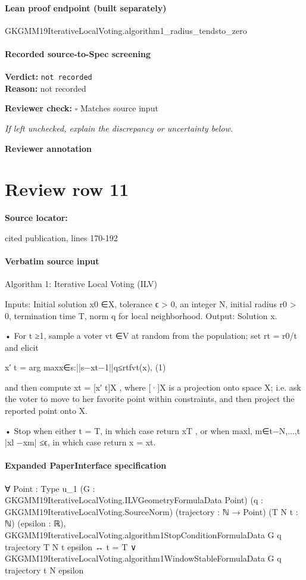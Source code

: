 \documentclass[10pt]{article}
\newcommand{\reviewerbox}{%
  \par\noindent\fbox{\parbox{0.96\linewidth}{\rule{0pt}{0.38in}}}\par
}
\newcommand{\reviewmatch}[1]{%
  \par\noindent\textbf{Reviewer check:} $\square$\; #1\par
  \noindent\emph{If left unchecked, explain the discrepancy or uncertainty below.}\par
}
\begin{document}
\paragraph{Lean proof endpoint (built separately)}\begin{ReviewVerbatim}
GKGMM19IterativeLocalVoting.algorithm1_radius_tendsto_zero
\end{ReviewVerbatim}

\paragraph{Recorded source-to-Spec screening}
\textbf{Verdict:} \texttt{not recorded}
\\
\textbf{Reason:} not recorded
\reviewmatch{Matches source input}
\noindent\textbf{Reviewer annotation}\par
\reviewerbox
\clearpage
\hypertarget{source-claim-f5582541b0eca601}{}
\section*{Review row 11}
\textbf{Source locator:} {\footnotesize\raggedright cited publication, lines 170-\allowbreak{}192\par}
\paragraph{Verbatim source input}
\begin{ReviewVerbatim}
Algorithm 1: Iterative Local Voting (ILV)

Inputs:
Initial solution x0 ∈X, tolerance ϵ > 0, an integer N, initial radius r0 > 0,
termination time T, norm q for local neighborhood.
Output:
Solution x.

• For t ≥1, sample a voter vt ∈V at random from the population; set rt = r0/t
and elicit

x′
t = arg maxx∈{s:||s−xt−1||q≤rt}fvt(x),
(1)

and then compute xt = [x′
t]X , where [·]X is a projection onto space X; i.e. ask
the voter to move to her favorite point within constraints, and then project the
reported point onto X.

• Stop when either t = T, in which case return xT , or when
maxl, m∈{t−N,...,t} |xl −xm| ≤ϵ, in which case return x = xt.
\end{ReviewVerbatim}


\paragraph{Expanded PaperInterface specification}
\begin{ReviewVerbatim}
∀ {Point : Type u_1} (G : GKGMM19IterativeLocalVoting.ILVGeometryFormulaData Point)
  (q : GKGMM19IterativeLocalVoting.SourceNorm) (trajectory : ℕ → Point) (T N t : ℕ) (epsilon : ℝ),
  GKGMM19IterativeLocalVoting.algorithm1StopConditionFormulaData G q trajectory T N t epsilon ↔
    t = T ∨ GKGMM19IterativeLocalVoting.algorithm1WindowStableFormulaData G q trajectory t N epsilon
\end{ReviewVerbatim}
\end{document}
